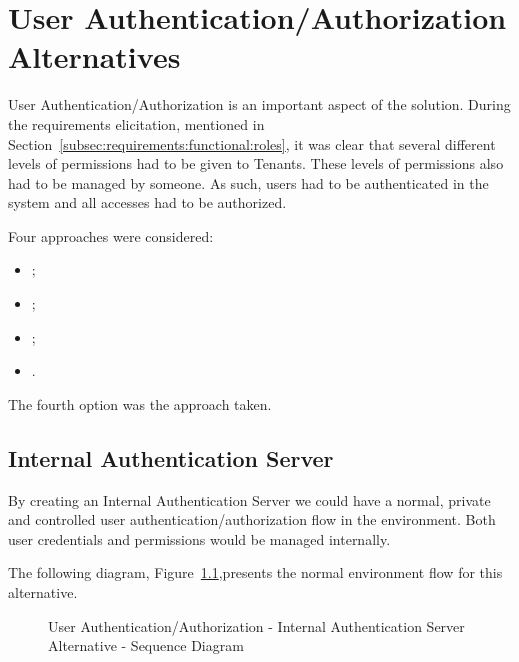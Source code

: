 
\chapter{User Authentication/Authorization Alternatives}
\label{appendix:design:alternatives:auth}

User Authentication/Authorization is an important aspect of the solution. During the requirements elicitation, mentioned in Section~\ref{subsec:requirements:functional:roles}, it was clear that several different levels of permissions had to be given to Tenants. These levels of permissions also had to be managed by someone. As such, users had to be authenticated in the system and all accesses had to be authorized.

Four approaches were considered:

\begin{itemize}
   \item {};
   \item {};
   \item {};
   \item {}.
\end{itemize}

The fourth option was the approach taken.

\section{Internal Authentication Server}
\label{sec:design:alternatives:auth:internalauth}

By creating an Internal Authentication Server we could have a normal, private and controlled user authentication/authorization flow in the environment. Both user credentials and permissions would be managed internally.

The following diagram, Figure~\ref{fig:design:alternatives:auth:internalauth:diagram},presents the normal environment flow for this alternative.

\begin{figure}[H]
   \centering
   \resizebox{\columnwidth}{!}
   {
      
   }
   \caption[User Authentication/Authorization - Internal Authentication Server Alternative - Sequence Diagram]{User Authentication/Authorization - Internal Authentication Server Alternative - Sequence Diagram}
   \label{fig:design:alternatives:auth:internalauth:diagram}
\end{figure}

